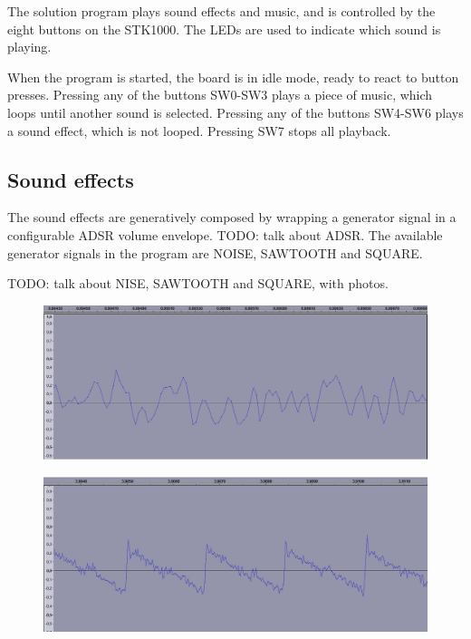 The solution program plays sound effects and music, and is controlled by the eight buttons on the STK1000.
The LEDs are used to indicate which sound is playing.

When the program is started, the board is in idle mode, ready to react to button presses.
Pressing any of the buttons SW0-SW3 plays a piece of music, which loops until another sound is selected.
Pressing any of the buttons SW4-SW6 plays a sound effect, which is not looped.
Pressing SW7 stops all playback.

\subsection{Sound effects}

The sound effects are generatively composed by wrapping a generator signal in a configurable ADSR volume envelope.
TODO: talk about ADSR.
The available generator signals in the program are NOISE, SAWTOOTH and SQUARE.

TODO: talk about NISE, SAWTOOTH and SQUARE, with photos.
\begin{figure}[H]
	\includegraphics[width = \textwidth]{images/SW6zoom.png}
	\caption{}
	\label{img-sw6zoom}
\end{figure}

\begin{figure}[H]
	\includegraphics[width = \textwidth]{images/SW5zoom.png}
	\caption{}
	\label{img-sw5zoom}
\end{figure}

